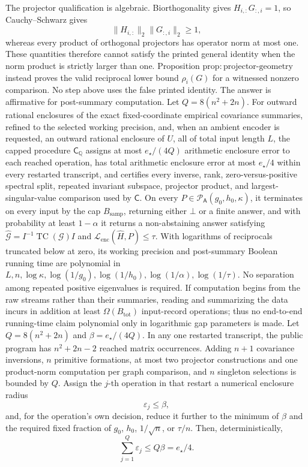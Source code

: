 The projector qualification is algebraic.  Biorthogonality gives \(H_{i,:}G_{:,i}=1\), so Cauchy--Schwarz gives
\[
 \|H_{i,:}\|_2\|G_{:,i}\|_2\ge1,
\]
whereas every product of orthogonal projectors has operator norm at most one.  These quantities therefore cannot satisfy the printed general identity when the norm product is strictly larger than one.  Proposition \(\mathrm{prop{:}projector\mbox{-}geometry}\) instead proves the valid reciprocal lower bound \(\rho_i(G)\) for a witnessed nonzero comparison.  No step above uses the false printed identity.
The answer is affirmative for post-summary computation.  Let \(Q=8(n^2+2n)\).  For outward rational enclosures of the exact fixed-coordinate empirical covariance summaries, refined to the selected working precision, and, when an ambient encoder is requested, an outward rational enclosure of \(U\), all of total input length \(L\), the capped procedure \(\mathsf C_{\mathbb Q}\) assigns at most \(e_{\star}/(4Q)\) arithmetic enclosure error to each reached operation, has total arithmetic enclosure error at most \(e_{\star}/4\) within every restarted transcript, and certifies every inverse, rank, zero-versus-positive spectral split, repeated invariant subspace, projector product, and largest-singular-value comparison used by \(\mathsf C\).  On every \(P\in\mathcal P_{\mathsf A}(g_0,h_0,\kappa)\), it terminates on every input by the cap \(B_{\mathrm{samp}}\), returning either \(\bot\) or a finite answer, and with probability at least \(1-\alpha\) it returns a non-abstaining answer satisfying \(\widehat{\mathcal G}=I^{-1}\operatorname{TC}(\mathcal G)I\) and \(\mathcal L_{\mathrm{enc}}(\widehat H,P)\le\tau\).  With logarithms of reciprocals truncated below at zero, its working precision and post-summary Boolean running time are polynomial in \(L,n,\log\kappa,\log(1/g_0),\log(1/h_0),\log(1/\alpha),\log(1/\tau)\).  No separation among repeated positive eigenvalues is required.  If computation begins from the raw streams rather than their summaries, reading and summarizing the data incurs in addition at least \(\Omega(B_{\mathrm{tot}})\) input-record operations; thus no end-to-end running-time claim polynomial only in logarithmic gap parameters is made.
Let \(Q=8(n^2+2n)\) and \(\beta=e_{\star}/(4Q)\).  In any one restarted transcript, the public program has \(n^2+2n-2\) reached matrix occurrences.  Adding \(n+1\) covariance inversions, \(n\) primitive formations, at most two projector constructions and one product-norm computation per graph comparison, and \(n\) singleton selections is bounded by \(Q\).  Assign the \(j\)-th operation in that restart a numerical enclosure radius
\[
 \varepsilon_j\le\beta,
 \tag{28}
\]
and, for the operation's own decision, reduce it further to the minimum of \(\beta\) and the required fixed fraction of \(g_0\), \(h_0\), \(1/\sqrt n\), or \(\tau/n\).  Then, deterministically,
\[
 \sum_{j=1}^{Q}\varepsilon_j\le Q\beta=e_{\star}/4.
 \tag{29}
\]

